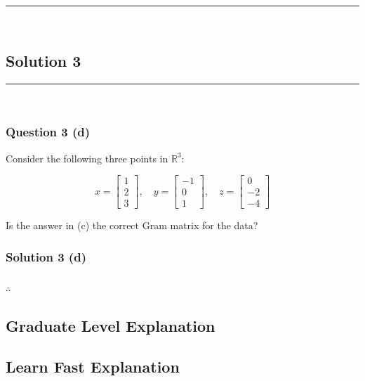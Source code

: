 \documentclass{article}
\begin{document}
\noindent\rule{\textwidth}{0.4pt}\\

\newpage

\subsection*{Solution 3}
\noindent\rule{\textwidth}{0.4pt}\\
\subsubsection*{Question 3 (d)}
\begin{flushleft}
    Consider the following three points in $\mathbb{R}^3$:

\[
x = \begin{bmatrix}1 \\ 2 \\ 3\end{bmatrix}, \quad
y = \begin{bmatrix}-1 \\ 0 \\ 1\end{bmatrix}, \quad
z = \begin{bmatrix}0 \\ -2 \\ -4\end{bmatrix}
\]

\end{flushleft}
\begin{flushleft}

Is the answer in (c) the correct Gram matrix for the data?
    
\end{flushleft}

\subsubsection*{Solution 3 (d)}


\subsubsection*{\normalfont}{$\therefore$ }

\subsection*{Graduate Level Explanation}

\subsection*{Learn Fast Explanation}
\end{document}
